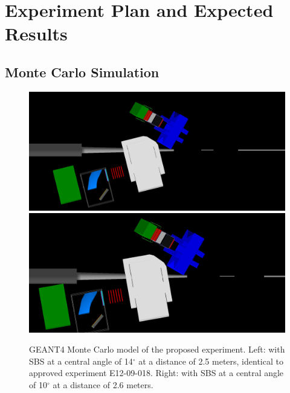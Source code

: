 \section{Experiment Plan and Expected Results}
\subsection{Monte Carlo Simulation}
\begin{figure}[h]
  \begin{center}
    \includegraphics[width=.48\textwidth]{figures/SIDISlayout14deg.png}
    \includegraphics[width=.48\textwidth]{figures/SIDISlayout10deg.png}
  \end{center}
  \caption{\label{fig:layout} GEANT4 Monte Carlo model of the proposed experiment. Left: with SBS at a central angle of 14$^\circ$ at a distance of 2.5 meters, identical to approved experiment E12-09-018. Right: with SBS at a central angle of 10$^\circ$ at a distance of 2.6 meters.}
\end{figure}
